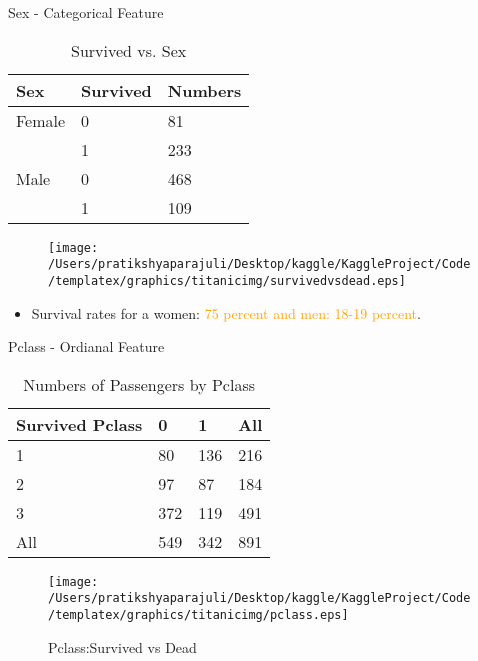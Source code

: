 \documentclass[
 size=14pt,
 paper=smartboard,  %
 mode=present, 		%
 display=slides, 	%
 style=tuliplab,  	%
 pauseslide,
 fleqn,leqno]{powerdot}
\begin{document}
\begin{slide}[toc=,bm=]{Sex - Categorical Feature}
  \setlength{\abovecaptionskip}{0pt}
  \setlength{\belowcaptionskip}{10pt}
  \centering
  \begin{table}[tb]
    \setlength{\abovecaptionskip}{0pt}
    \setlength{\belowcaptionskip}{10pt}
    \centering
    \caption{Survived vs. Sex}
    
    \begin{tabular}{p{1.5cm}p{1.9cm}p{2.9cm}}
    \hline
      Sex & Survived & Numbers \\
    \hline
      Female   & 0    & 81 \\
        & 1 & 233 \\
      Male & 0  & 468 \\
        & 1  & 109  \\
    \hline
    \end{tabular}
    \end{table}
    \begin{figure}
      \centering
      \centerline{\texttt{[image: /Users/pratikshyaparajuli/Desktop/kaggle/KaggleProject/Code/templatex/graphics/titanicimg/survivedvsdead.eps]}}
    \end{figure}
    \begin{itemize}
      \item
      Survival rates for a women: \textcolor{orange}{75 percent and men: 18-19 percent}.
      \end{itemize}
\end{slide}
\begin{slide}[toc=,bm=]{Pclass - Ordianal Feature}
  \setlength{\abovecaptionskip}{0pt}
  \setlength{\belowcaptionskip}{10pt}
  \centering
  \begin{table}[tb]
    \setlength{\abovecaptionskip}{0pt}
    \setlength{\belowcaptionskip}{10pt}
    \centering
    \caption{Numbers of Passengers by Pclass}
    
    \begin{tabular}{p{1.5cm}p{1.9cm}p{2.9cm}p{2.9cm}}
    \hline
    Survived Pclass & 0 & 1 & All \\
    \hline
      1   & 80    & 136    &   216     \\
      2   & 97    & 87     &   184   \\
      3   & 372   & 119    &   491  \\
      All & 549   & 342    &   891 \\
    \hline
    \end{tabular}
    \end{table}
    \vspace{0.2cm}
\begin{figure}
  \centering
  \centerline{
    \texttt{[image: /Users/pratikshyaparajuli/Desktop/kaggle/KaggleProject/Code/templatex/graphics/titanicimg/pclass.eps]}
    }
    \caption{Pclass:Survived vs Dead}\label{fig:Pclass:Survived vs Dead}
\end{figure}
\end{slide}
\end{document}
